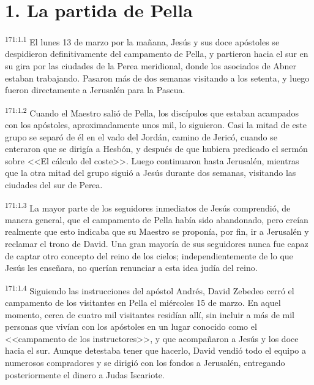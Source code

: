 \section*{1. La partida de Pella}
\par 
\textsuperscript{171:1.1} El lunes 13 de marzo por la mañana, Jesús y sus doce apóstoles se despidieron definitivamente del campamento de Pella, y partieron hacia el sur en su gira por las ciudades de la Perea meridional, donde los asociados de Abner estaban trabajando. Pasaron más de dos semanas visitando a los setenta, y luego fueron directamente a Jerusalén para la Pascua.

\par 
\textsuperscript{171:1.2} Cuando el Maestro salió de Pella, los discípulos que estaban acampados con los apóstoles, aproximadamente unos mil, lo siguieron. Casi la mitad de este grupo se separó de él en el vado del Jordán, camino de Jericó, cuando se enteraron que se dirigía a Hesbón, y después de que hubiera predicado el sermón sobre <<El cálculo del coste>>. Luego continuaron hasta Jerusalén, mientras que la otra mitad del grupo siguió a Jesús durante dos semanas, visitando las ciudades del sur de Perea.

\par 
\textsuperscript{171:1.3} La mayor parte de los seguidores inmediatos de Jesús comprendió, de manera general, que el campamento de Pella había sido abandonado, pero creían realmente que esto indicaba que su Maestro se proponía, por fin, ir a Jerusalén y reclamar el trono de David. Una gran mayoría de sus seguidores nunca fue capaz de captar otro concepto del reino de los cielos; independientemente de lo que Jesús les enseñara, no querían renunciar a esta idea judía del reino.

\par 
\textsuperscript{171:1.4} Siguiendo las instrucciones del apóstol Andrés, David Zebedeo cerró el campamento de los visitantes en Pella el miércoles 15 de marzo. En aquel momento, cerca de cuatro mil visitantes residían allí, sin incluir a más de mil personas que vivían con los apóstoles en un lugar conocido como el <<campamento de los instructores>>, y que acompañaron a Jesús y los doce hacia el sur. Aunque detestaba tener que hacerlo, David vendió todo el equipo a numerosos compradores y se dirigió con los fondos a Jerusalén, entregando posteriormente el dinero a Judas Iscariote.

